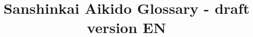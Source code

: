 \documentclass{memoir}
\begin{document}
\title{Sanshinkai Aikido Glossary - draft version EN}
\maketitle


\end{document}
